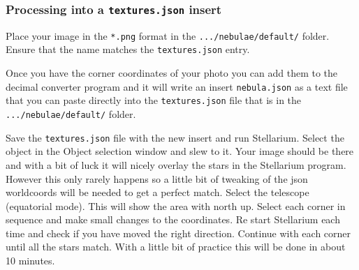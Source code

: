 \subsubsection{\texorpdfstring{Processing into a \texttt{textures.json}
insert}{Processing into a textures.json insert}}\label{processing-into-a-textures.json-insert}

Place your image in the \texttt{*.png} format in the
\texttt{.../nebulae/default/} folder. Ensure that the name matches the
\texttt{textures.json} entry.

Once you have the corner coordinates of your photo you can add them to
the decimal converter program and it will write an insert
\texttt{nebula.json} as a text file that you can paste directly into the
\texttt{textures.json} file that is in the \texttt{.../nebulae/default/}
folder.

Save the \texttt{textures.json} file with the new insert and run
Stellarium. Select the object in the Object selection window and slew to
it. Your image should be there and with a bit of luck it will nicely
overlay the stars in the Stellarium program. However this only rarely
happens so a little bit of tweaking of the json worldcoords will be
needed to get a perfect match. Select the telescope (equatorial mode).
This will show the area with north up. Select each corner in sequence
and make small changes to the coordinates. Re start Stellarium each time
and check if you have moved the right direction. Continue with each
corner until all the stars match. With a little bit of practice this
will be done in about 10 minutes.


